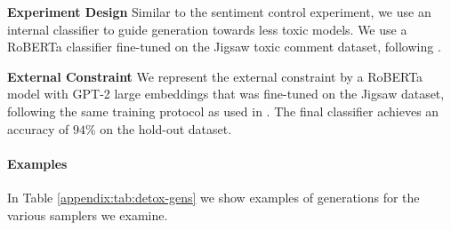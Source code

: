 \textbf{Experiment Design} Similar to the sentiment control experiment, we use an internal classifier to guide generation towards less toxic models. 
We use a RoBERTa classifier fine-tuned on the Jigsaw toxic comment dataset, following \citet{kumar2022gradient, liu2023bolt}. 


\textbf{External Constraint} We represent the external constraint by a RoBERTa model with GPT-2 large embeddings that was fine-tuned on the Jigsaw dataset, following the same training protocol as used in \citet{liu2023bolt}. The final classifier achieves an accuracy of $94\%$ on the hold-out dataset.  

\paragraph{Examples} In Table \ref{appendix:tab:detox-gens} we show examples of generations for the various samplers we examine. 

